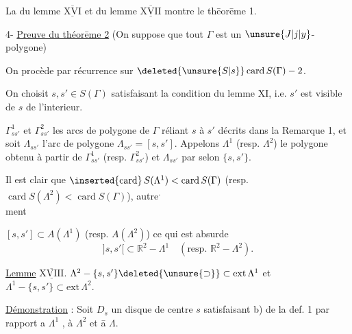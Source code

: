 La  du lemme $\underline{\overline{\mathrm{XVI}}}$ et du lemme $\underline{\overline{\mathrm{XVII}}}$ montre le thēorēme 1.

4- \uline{Preuve du théorēme 2} (On suppose que tout  $\Gamma$ est un $\unsure{J|j|y}$-polygone)

On procède par récurrence sur $\deleted{\unsure{S|s}}\mathop{\mathrm{card}} S(\Gamma)-2$.

On choisit $s,s'\in S(\Gamma)$ satisfaisant la condition du lemme XI, i.e. $s'$ est visible de $s$ de l'interieur.

  $\Gamma^{1}_{ss'}$ et $\Gamma^{2}_{ss'}$  les  arcs de polygone de $\Gamma$ réliant $s$ à $s'$ décrits dans la Remarque 1, et soit $\Lambda_{ss'}$ l'arc de polygone $\Lambda_{ss'}=[s,s']$. Appelons $\Lambda^{1}$  (resp. $\Lambda^{2}$) le polygone obtenu à partir de $\Gamma^{1}_{ss'}$ (resp. $\Gamma^{2}_{ss'}$) et $\Lambda_{ss'}$ par  selon $\{s,s'\}$.

Il est clair que $\inserted{\mathrm{card}}\,S(\Lambda^{1})<\mathop{\mathrm{card}} S(\Gamma)$ (resp. $\mathop{\mathrm{card}} S(\Lambda^{2})<\mathop{\mathrm{card}} S(\Gamma)$), autre\textsuperscript{.}\\ment

$[s,s']\subset A(\Lambda^{1})$ (resp. $A(\Lambda^{2})$) ce qui est absurde 
\[
{]s,s'[}\subset\mathbb{R}^{2}-\Lambda^{1}\quad(\text{resp. }\mathbb{R}^{2}-\Lambda^{2}).
\]

\uline{Lemme} $\underline{\overline{\mathrm{XVIII}}}$. $\Lambda^{2}-\{s,s'\}\deleted{\unsure{\supset}}\subset\mathrm{ext}\,\Lambda^{1}$ et $\Lambda^{1}-\{s,s'\}\subset\mathrm{ext}\,\Lambda^{2}$.

\uline{Démonstration} : Soit $D_s$ un disque de centre $s$ satisfaisant b) de la def. 1 par rapport a $\Lambda^{1}$ , à $\Lambda^{2}$ et \={a} $\Lambda$.

